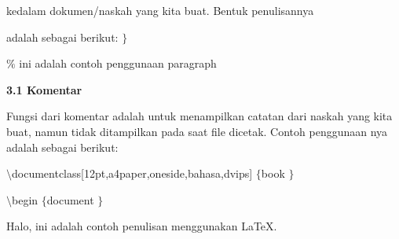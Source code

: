  \par
{\fontsize{10pt}{10pt}\selectfont  \hspace*{0.64in}  \hspace*{0.64in}  \hspace*{0.64in} kedalam dokumen/naskah yang kita buat. Bentuk penulisannya }
 \par
{\fontsize{10pt}{10pt}\selectfont  \hspace*{0.64in}  \hspace*{0.64in}  \hspace*{0.64in} adalah sebagai berikut: $  \}  $}
 \par
{\fontsize{10pt}{10pt}\selectfont   \hspace*{0.64in}  \hspace*{0.64in}  \hspace*{0.64in}  \hspace*{0.64in}  $  \%  $ ini adalah contoh penggunaan paragraph}
 \par
\vspace{10pt}
\textbf{3.1 Komentar}
 \par
 \par
 \textbf{ }Fungsi dari komentar adalah untuk menampilkan catatan dari naskah yang kita buat, namun tidak ditampilkan pada saat file dicetak. Contoh penggunaan nya adalah sebagai berikut:
 \par
{\fontsize{10pt}{10pt}\selectfont  $  \setminus  $documentclass[12pt,a4paper,oneside,bahasa,dvips] $  \{  $book $  \}  $}
 \par
{\fontsize{10pt}{10pt}\selectfont  $  \setminus  $begin $  \{  $document $  \}  $}
 \par
{\fontsize{10pt}{10pt}\selectfont Halo, ini adalah contoh penulisan menggunakan LaTeX.}
 \par
